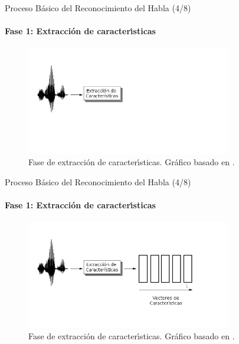 \begin{frame}{Proceso B\'asico del Reconocimiento del Habla (4/8)}
\framesubtitle{Fase 1: Extracci\'on de caracter{\'\i}sticas}

\begin{figure}[H] 
\centering
\includegraphics[width=0.8\textwidth]{./graphics/extraccion_0.png}
\caption{Fase de extracci\'on de caracter{\'\i}sticas. Gr\'afico basado en \cite{VerenichASR}.}
\label{figure:hmm}
\end{figure}
\end{frame}

\begin{frame}{Proceso B\'asico del Reconocimiento del Habla (4/8)}
\framesubtitle{Fase 1: Extracci\'on de caracter{\'\i}sticas}

\begin{figure}[H] 
\centering
\includegraphics[width=0.8\textwidth]{./graphics/extraccion.png}
\caption{Fase de extracci\'on de caracter{\'\i}sticas. Gr\'afico basado en \cite{VerenichASR}.}
\label{figure:hmm}
\end{figure}
\end{frame}


